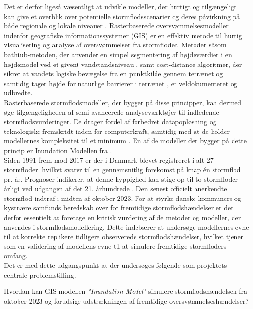 Det er derfor ligeså væsentligt at udvikle modeller, der hurtigt og tilgængeligt kan give et overblik over potentielle stormflodsscenarier og deres påvirkning på både regionale og lokale niveauer \citep{balstrom_kirby_inundation}. Rasterbaserede oversvømmelsesmodeller indenfor geografiske informationssystemer (GIS) er en effektiv metode til hurtig visualisering og analyse af oversvømmelser fra stormfloder. Metoder såsom bathtub-metoden, der anvender en simpel segmentering af højdeværdier i en højdemodel ved et givent vandstandsniveau \citep{poulter_raster_2008}, samt cost-distance algoritmer, der sikrer at vandets logiske bevægelse fra en punktkilde gennem terrænet og samtidig tager højde for naturlige barrierer i terrænet \citep{li_delineating_2014}, er veldokumenteret og udbredte.\\
Rasterbaserede stormflodsmodeller, der bygger på disse principper, kan dermed øge tilgængeligheden af semi-avancerede analyseværktøjer til indledende stormflodsvurderinger. De drager fordel af forbedret datapopløsning og teknologiske fremskridt inden for computerkraft, samtidig med at de holder modellernes kompleksitet til et minimum \citep{balstrom_kirby_inundation, li_delineating_2014}. En af de modeller der bygger på dette princip er Inundation Modellen fra \cite{balstrom_kirby_inundation}.\\

Siden 1991 frem mod 2017 er der i Danmark blevet registreret i alt 27 stormfloder, hvilket svarer til en gennemsnitlig forekomst på knap én stormflod pr. år. Prognoser indikerer, at denne hyppighed kan stige op til to stormfloder årligt ved udgangen af det 21. århundrede \citep{erhvervsministeriet_fremtidige_nodate}. Den senest officielt anerkendte stormflod indtraf i midten af oktober 2023. For at styrke danske kommuners og kystnære samfunds beredskab over for fremtidige stormflodshændelser er det derfor essentielt at foretage en kritisk vurdering af de metoder og modeller, der anvendes i stormflodsmodellering. Dette indebærer at undersøge modellernes evne til at korrekte replikere tidligere observerede stormflodshændelser, hvilket tjener som en validering af modellens evne til at simulere fremtidige stormfloders omfang.\\

Det er med dette udgangspunkt at der undersøges følgende som projektets centrale problemstilling. 
\begin{center}
    {\centering Hvordan kan GIS-modellen \textit{"Inundation Model"} simulere stormflodshændelsen fra oktober 2023 og forudsige udstrækningen af fremtidige oversvømmelseshændelser?}
\end{center}

